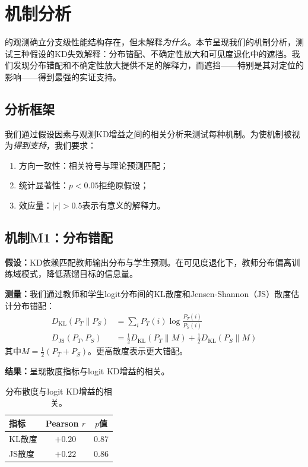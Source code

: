 \section{机制分析}
\label{sec:mechanism}

的观测确立分支级性能结构存在，但未解释\emph{为什么}。本节呈现我们的机制分析，测试三种假设的KD失效解释：分布错配、不确定性放大和可见度退化中的遮挡。我们发现分布错配和不确定性放大提供不足的解释力，而遮挡——特别是其对定位的影响——得到最强的实证支持。

\subsection{分析框架}

我们通过假设因素与观测KD增益之间的相关分析来测试每种机制。为使机制被视为\emph{得到支持}，我们要求：
\begin{enumerate}
    \item 方向一致性：相关符号与理论预测匹配；
    \item 统计显著性：$p < 0.05$拒绝原假设；
    \item 效应量：$|r| > 0.5$表示有意义的解释力。
\end{enumerate}

\subsection{机制M1：分布错配}

\textbf{假设：}KD依赖匹配教师输出分布与学生预测。在可见度退化下，教师分布偏离训练域模式，降低蒸馏目标的信息量\cite{wang2020cross}。

\textbf{测量：}我们通过教师和学生logit分布间的KL散度和Jensen-Shannon（JS）散度估计分布错配：
\begin{align}
D_{\text{KL}}(P_T \| P_S) &= \sum_i P_T(i) \log \frac{P_T(i)}{P_S(i)} \\
D_{\text{JS}}(P_T, P_S) &= \frac{1}{2} D_{\text{KL}}(P_T \| M) + \frac{1}{2} D_{\text{KL}}(P_S \| M)
\end{align}
其中$M = \frac{1}{2}(P_T + P_S)$。更高散度表示更大错配。

\textbf{结果：}呈现散度指标与logit KD增益的相关。

\begin{table}[htbp]
\centering
\caption{分布散度与logit KD增益的相关。}
\label{tab:divergence_corr}
\begin{tabular}{@{}lcc@{}}
\toprule
指标 & Pearson $r$ & $p$值 \\
\midrule
KL散度 & $+0.20$ & $0.87$ \\
JS散度 & $+0.22$ & $0.86$ \\
\bottomrule
\end{tabular}
\end{table}

